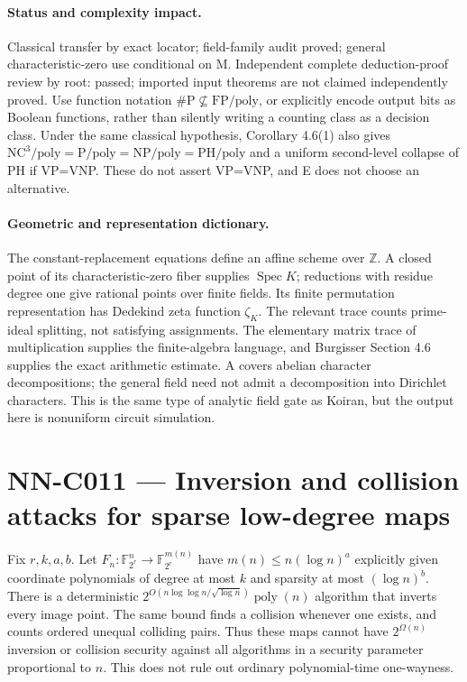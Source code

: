 \paragraph{Status and complexity impact.}
Classical transfer by exact locator; field-family audit proved; general characteristic-zero use conditional on M. Independent complete deduction-proof review by root: passed; imported input theorems are not claimed independently proved. Use function notation $\#\mathrm P\not\subseteq\mathrm{FP}/\mathrm{poly}$, or explicitly encode output bits as Boolean functions, rather than silently writing a counting class as a decision class. Under the same classical hypothesis, Corollary 4.6(1) also gives $\mathrm{NC}^3/\mathrm{poly}=\mathrm P/\mathrm{poly}=\mathrm{NP}/\mathrm{poly}=\mathrm{PH}/\mathrm{poly}$ and a uniform second-level collapse of PH if VP=VNP. These do not assert VP=VNP, and E does not choose an alternative.

\paragraph{Geometric and representation dictionary.}
The constant-replacement equations define an affine scheme over $\mathbb Z$. A closed point of its characteristic-zero fiber supplies $\operatorname{Spec}K$; reductions with residue degree one give rational points over finite fields. Its finite permutation representation has Dedekind zeta function $\zeta_K$. The relevant trace counts prime-ideal splitting, not satisfying assignments. The elementary matrix trace of multiplication supplies the finite-algebra language, and Burgisser Section 4.6 supplies the exact arithmetic estimate. A covers abelian character decompositions; the general field need not admit a decomposition into Dirichlet characters. This is the same type of analytic field gate as Koiran, but the output here is nonuniform circuit simulation.



\section{NN-C011 --- Inversion and collision attacks for sparse low-degree maps}
\begin{proposition}[NN-C011]
Fix $r,k,a,b$. Let $F_n:\mathbb F_{2^r}^n\to\mathbb F_{2^r}^{m(n)}$ have $m(n)\leq n(\log n)^a$ explicitly given coordinate polynomials of degree at most $k$ and sparsity at most $(\log n)^b$. There is a deterministic $2^{O(n\log\log n/\sqrt{\log n})}\operatorname{poly}(n)$ algorithm that inverts every image point. The same bound finds a collision whenever one exists, and counts ordered unequal colliding pairs. Thus these maps cannot have $2^{\Omega(n)}$ inversion or collision security against all algorithms in a security parameter proportional to $n$. This does not rule out ordinary polynomial-time one-wayness.
\end{proposition}
